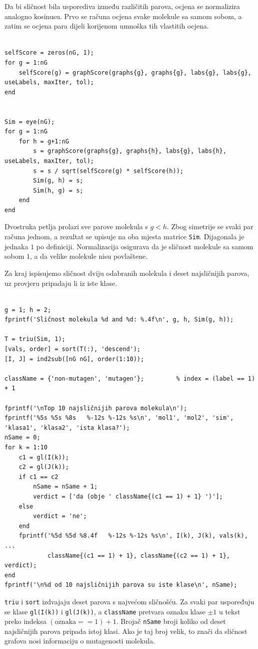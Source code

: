 \documentclass[12pt, letterpaper]{article}
\numberwithin{figure}{section}
\begin{document}
Da bi sličnost bila usporediva između različitih parova, ocjena se normalizira analogno kosinusu. Prvo se računa ocjena svake molekule sa samom sobom, a zatim se ocjena para dijeli korijenom umnoška tih vlastitih ocjena.

\begin{lstlisting}[style=octave, caption={Normalizirana matrica sličnosti molekula}, label={lst:mutag_sim}]

selfScore = zeros(nG, 1);
for g = 1:nG
    selfScore(g) = graphScore(graphs{g}, graphs{g}, labs{g}, labs{g}, useLabels, maxIter, tol);
end


Sim = eye(nG);
for g = 1:nG
    for h = g+1:nG
        s = graphScore(graphs{g}, graphs{h}, labs{g}, labs{h}, useLabels, maxIter, tol);
        s = s / sqrt(selfScore(g) * selfScore(h));
        Sim(g, h) = s;
        Sim(h, g) = s;
    end
end
\end{lstlisting}
Dvostruka petlja prolazi sve parove molekula s $g<h$. Zbog simetrije se svaki par računa jednom, a rezultat se upisuje na oba mjesta matrice \texttt{Sim}. Dijagonala je jednaka $1$ po definiciji. Normalizacija osigurava da je sličnost molekule sa samom sobom $1$, a da velike molekule nisu povlaštene.

Za kraj ispisujemo sličnost dviju odabranih molekula i deset najsličnijih parova, uz provjeru pripadaju li iz iste klase.

\begin{lstlisting}[style=octave, caption={Najsličniji parovi i usporedba s klasama}, label={lst:mutag_top}]

g = 1; h = 2;
fprintf('Sličnost molekula %d and %d: %.4f\n', g, h, Sim(g, h));

T = triu(Sim, 1);
[vals, order] = sort(T(:), 'descend');
[I, J] = ind2sub([nG nG], order(1:10));

className = {'non-mutagen', 'mutagen'};         % index = (label == 1) + 1

fprintf('\nTop 10 najsličnijih parova molekula\n');
fprintf('%5s %5s %8s   %-12s %-12s %s\n', 'mol1', 'mol2', 'sim', 'klasa1', 'klasa2', 'ista klasa?');
nSame = 0;
for k = 1:10
    c1 = gl(I(k));
    c2 = gl(J(k));
    if c1 == c2
        nSame = nSame + 1;
        verdict = ['da (obje ' className{(c1 == 1) + 1} ')'];
    else
        verdict = 'ne';
    end
    fprintf('%5d %5d %8.4f   %-12s %-12s %s\n', I(k), J(k), vals(k), ...
            className{(c1 == 1) + 1}, className{(c2 == 1) + 1}, verdict);
end
fprintf('\n%d od 10 najsličnijih parova su iste klase\n', nSame);
\end{lstlisting}
\texttt{triu} i \texttt{sort} izdvajaju deset parova s najvećom sličnošću. Za svaki par uspoređuju se klase \texttt{gl(I(k))} i \texttt{gl(J(k))}, a \texttt{className} pretvara oznaku klase $\pm1$ u tekst preko indeksa $(\text{oznaka}==1)+1$. Brojač \texttt{nSame} broji koliko od deset najsličnijih parova pripada istoj klasi. Ako je taj broj velik, to znači da sličnost grafova nosi informaciju o mutagenosti molekula.
\end{document}
